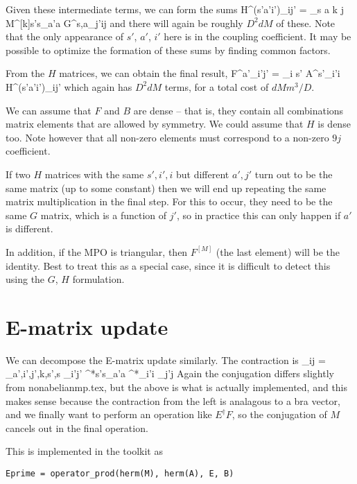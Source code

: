 \documentclass{article}[10pt]
\begin{document}
Given these intermediate terms, we can form the sums
\beq
H^{(s'a'i')}_{ij'} = \sum_{s a k j}
 \:
M^{[k]s's}_{a'a}
G^{s,a}_{j'ij}
\eeq
and there will again be roughly $D^2 dM$ of these.
Note that the only appearance of $s'$, $a'$, $i'$ here is in the coupling coefficient.
It may be possible to optimize the formation of these sums by finding common factors.

From the $H$ matrices, we can obtain the final result,
\beq
F^{a'}_{i'j'} = \sum_{i s'} A^{s'}_{i'i} H^{(s'a'i')}_{ij'}
\eeq
which again has $D^2 dM$ terms, for a total cost of $d M m^3 / D$.

We can assume that $F$ and $B$ are dense -- that is, they contain all combinations matrix elements that are allowed
by symmetry. We could assume that $H$ is dense too. Note however that all non-zero elements must correspond
to a non-zero $9j$ coefficient.

If two $H$ matrices with the same $s',i',i$ but different $a',j'$ turn out to be the same matrix (up to
some constant) then we will end up repeating the same matrix multiplication in the final step.
For this to occur, they need to be the same $G$ matrix, which is a function of $j'$, so in practice
this can only happen if $a'$ is different.

In addition, if the MPO is triangular, then $F^{[M]}$ (the last element) will be the identity. Best to treat this
as a special case, since it is difficult to detect this using the $G$, $H$ formulation.


\section{E-matrix update}

We can decompose the E-matrix update similarly. The contraction is
\beq
{}_{ij} = \sum_{a',i',j',k,s',s}
_{i'j'}
^{*s's}_{a'a} ^*_{i'i} _{j'j}
\eeq
Again the conjugation differs slightly from nonabelianmp.tex, but the above is what is actually implemented,
and this makes sense because the contraction from the left is analagous to a bra vector, and we finally
want to perform an operation like $E^\dagger F$, so the conjugation of $M$ cancels out in the final operation.

This is implemented in the toolkit as
\begin{verbatim}Eprime = operator_prod(herm(M), herm(A), E, B)\end{verbatim}
\end{document}
